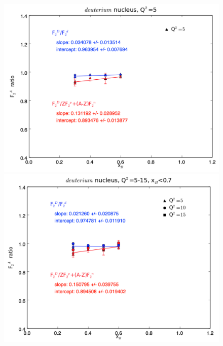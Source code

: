 \documentclass[oneside]{article}
\begin{document}
 \begin{figure}
\begin{minipage}{0.5\textwidth}
 \includegraphics[width=\textwidth]{plots/q2_5/q2_5_D.png}
\end{minipage}\hfill\begin{minipage}{0.5\textwidth}
\includegraphics[width=\textwidth]{plots/q2_all_x_l7/q2_all_x_l7_D.png}
\end{minipage}\hfill\begin{minipage}{0.5\textwidth}

\end{minipage}
\end{figure}
\end{document}
